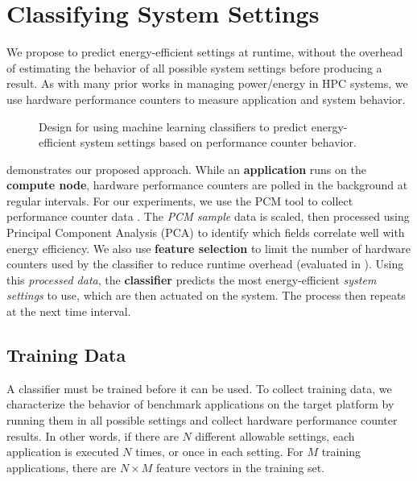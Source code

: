 \section{Classifying System Settings}
\label{sec:classifiers-framework}

We propose to predict energy-efficient settings at runtime, without the overhead of estimating the behavior of all possible system settings before producing a result.
As with many prior works in managing power/energy in HPC systems, we use hardware performance counters to measure application and system behavior.

\begin{figure}[t]
  \begin{centering}
    
    \caption{Design for using machine learning classifiers to predict energy-efficient system settings based on performance counter behavior.}
    \label{fig:classifier-runtime}
  \end{centering}
\end{figure}

 demonstrates our proposed approach.
While an \textbf{application} runs on the \textbf{compute node}, hardware performance counters are polled in the background at regular intervals.
For our experiments, we use the PCM tool to collect performance counter data \cite{PCMGit}.
The \emph{PCM sample} data is scaled, then processed using Principal Component Analysis (PCA) to identify which fields correlate well with energy efficiency.
We also use \textbf{feature selection} to limit the number of hardware counters used by the classifier to reduce runtime overhead (evaluated in ).
Using this \emph{processed data}, the \textbf{classifier} predicts the most energy-efficient \emph{system settings} to use, which are then actuated on the system.
The process then repeats at the next time interval.


\subsection{Training Data}


A classifier must be trained before it can be used.
To collect training data, we characterize the behavior of benchmark applications on the target platform by running them in all possible settings and collect hardware performance counter results.
In other words, if there are $N$ different allowable settings, each application is executed $N$ times, or once in each setting.
For $M$ training applications, there are $N \times M$ feature vectors in the training set.

